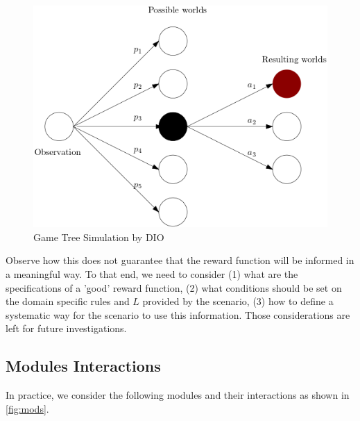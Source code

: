 \begin{figure}
  \centering
  \includegraphics[scale=0.55]{figures/scworlds.png}
  \caption{Game Tree Simulation by DIO}
  \label{fig:diosim}
\end{figure}

Observe how this does not guarantee that the reward function will be informed in a meaningful way.
To that end, we need to consider (1) what are the specifications of a 'good' reward function, (2) what conditions should be set 
on the domain specific rules and $L$ provided by the scenario, (3) how to define a systematic way for the scenario to use 
this information. Those considerations are left for future
investigations. 
 

\subsection{Modules Interactions}
\label{sec:modules}
In practice, we consider the following modules and their interactions as shown in \ref{fig:mods}.

